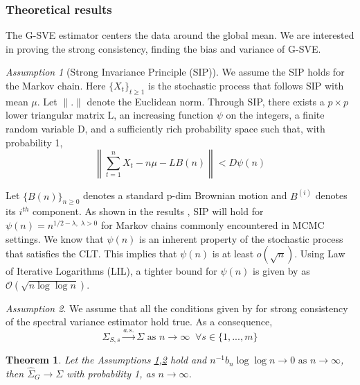 \documentclass[11pt]{article}
\newtheorem{theorem}{Theorem}
\theoremstyle{remark}
\newtheorem{ass}{Assumption}
\begin{document}
\subsubsection{Theoretical results} \label{sec:G-SVE}

The G-SVE estimator centers the data around the global mean. We are interested in proving the strong consistency, finding the bias and variance of G-SVE. 

\begin{ass}[Strong Invariance Principle (SIP)] \label{ass:sip}
    We assume the SIP holds for the Markov chain. Here $\{X_t\}_{t\geq 1}$ is the stochastic process that follows SIP with mean $\mu$. Let $\|.\|$ denote the Euclidean norm. Through SIP, there exists a $p \times p$ lower triangular matrix L, an increasing function $\psi$ on the integers, a finite random variable D, and a  sufficiently rich probability space such that, with probability 1, \\
  $$\left\|\sum_{t=1}^{n}X_t - n\mu - LB(n)\right\| < D\psi(n)$$
  
  Let $\{B(n)\}_{n\geq 0}$ denotes a standard p-dim Brownian motion and $B^{(i)}$ denotes its $i^{th}$ component. As shown in the results \cite{kuelbs1980almost}, SIP will hold for $\psi(n) = n^{1/2 - \lambda, \; \lambda > 0}$ for Markov chains commonly encountered in MCMC settings. We know that $\psi(n)$ is an inherent property of the stochastic process that satisfies the CLT. This implies that $\psi(n)$ is at least $o(\sqrt{n})$. Using Law of Iterative Logarithms (LIL), a tighter bound for $\psi(n)$ is given by \cite{stra:1964} as $\mathcal{O}(\sqrt{n\log \log n})$.
\end{ass}


\begin{ass} \label{ass:sve_consis} We assume that all the conditions given by \cite{vats:fleg:jon:2018} for strong consistency of the spectral variance estimator hold true. As a consequence, 
\[
\hat{\Sigma}_{S,s} \xrightarrow{a.s.} \Sigma \textrm{ as } n \to \infty \;\; \forall s \in \{1,..., m\}
\]
\end{ass}




\begin{theorem}
\label{th:consistency}
 Let the Assumptions \ref{ass:sip},\ref{ass:sve_consis} hold and $n^{-1}{b_n \log \log n} \to 0 \textrm{ as } n \to \infty$, then $\hat{\Sigma}_{G} \to \Sigma$ with probability 1, as $n \to \infty$.
\end{theorem} 
\end{document}
